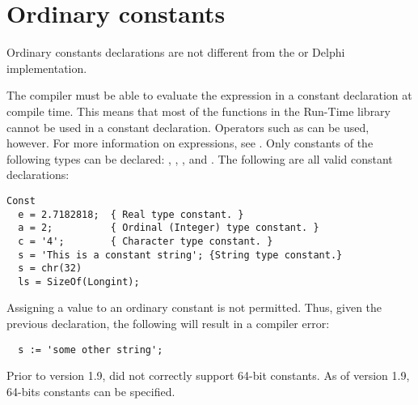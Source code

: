 \section{Ordinary constants}
Ordinary constants declarations are not different from the \tp or
Delphi implementation.

The compiler must be able to evaluate the expression in a constant
declaration at compile time.  This means that most of the functions
in the Run-Time library cannot be used in a constant
declaration.
Operators such as  can be used, however. For more 
information on expressions, see .
Only constants of the following types can be declared: , , , and .
The following are all valid constant declarations:
\begin{verbatim}
Const
  e = 2.7182818;  { Real type constant. }
  a = 2;          { Ordinal (Integer) type constant. }
  c = '4';        { Character type constant. }
  s = 'This is a constant string'; {String type constant.}
  s = chr(32)
  ls = SizeOf(Longint);
\end{verbatim}
Assigning a value to an ordinary constant is not permitted.
Thus, given the previous declaration, the following will result
in a compiler error:
\begin{verbatim}
  s := 'some other string';
\end{verbatim}

Prior to version 1.9, \fpc did not correctly support 64-bit constants. As
of version 1.9, 64-bits constants can be specified.


